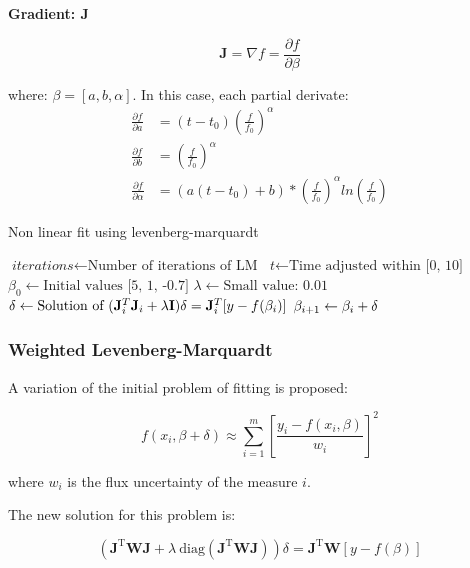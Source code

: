 \documentclass[10pt]{article}
\begin{document}
\noindent\textbf{Gradient: $\mathbf{J}$} 

$$ \mathbf{J} = \nabla f = \frac{\partial f}{\partial \beta} $$ 

where: $\beta = [a, b, \alpha]$. In this case, each partial derivate:
\begin{align*}
    \frac{\partial f}{\partial a}           &= (t - t_0)\left(\frac{f}{f_0}\right)^\alpha \\
    \frac{\partial f}{\partial b}           &= \left(\frac{f}{f_0}\right)^\alpha \\
    \frac{\partial f}{\partial \alpha}      &= (a(t-t_0)+b)*\left(\frac{f}{f_0}\right)^\alpha ln\left(\frac{f}{f_0}\right)
\end{align*}

\begin{algorithm}[H]
\caption{Non linear fit using levenberg-marquardt}\label{4months}
\begin{algorithmic}[1]
\State $\textit{iterations} \gets \text{Number of iterations of LM}$
\Statex
\State $\textit{t} \gets \text{Time adjusted within [0, 10]}$
\Statex
\State $\textit{$\beta_0$} \gets \text{Initial values [5, 1, -0.7]}$
\Statex
\State $\textit{$\lambda$} \gets \text{Small value: 0.01}$
\Statex
{}
\Statex
\State $\textit{$\delta$} \gets \text{Solution of $ (\mathbf{J}_i^{T}\mathbf{J}_i + \lambda\mathbf{I})\delta = \mathbf{J}_i^{T}[y - f(\beta_i)] $}$
\Statex
\State $\textit{$\beta_{i+1}$} \gets \text{$ \beta_i + \delta $}$
\Statex
\EndFor
\State {}
\EndProcedure
\end{algorithmic}
\end{algorithm}

\subsubsection{Weighted Levenberg-Marquardt}
A variation of the initial problem of fitting is proposed:

$$ f(x_i, \beta + \delta) \approx \sum\limits_{i=1}^m \left[\frac{y_i - f(x_i, \beta)}{w_i} \right]^2 $$

\noindent where $w_i$ is the flux uncertainty of the measure $i$.

\noindent The new solution for this problem is:

$$ (\mathbf{J}^{\text{T}}\mathbf{W}\mathbf{J} + \lambda~\text{diag}(\mathbf{J}^{\text{T}}\mathbf{W}\mathbf{J})) \delta = \mathbf{J}^{\text{T}}\mathbf{W}[y - f(\beta)] $$
\end{document}
